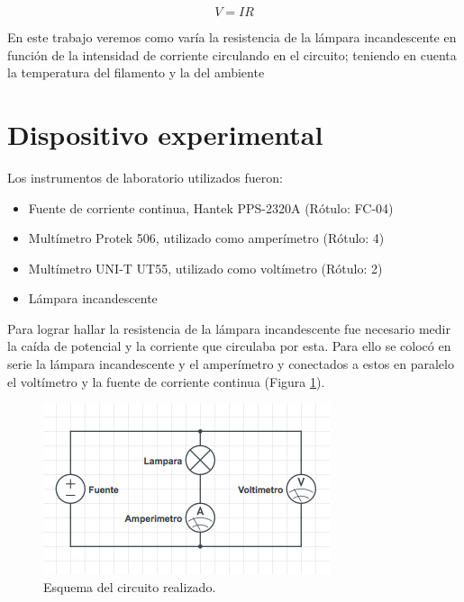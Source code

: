 \documentclass[twoside,twocolumn,a4paper]{article}
\begin{document}
\begin{equation}
\label{eq:ohm2}
V = IR
\end{equation}
\par En este trabajo veremos como var\'ia la resistencia de la l\'ampara incandescente en funci\'on de la intensidad de corriente circulando en el circuito; teniendo en cuenta la temperatura del filamento y la del ambiente



\section{Dispositivo experimental}

Los instrumentos de laboratorio utilizados fueron:
\begin{itemize}
\item 
\label{Fuente} Fuente de corriente continua, Hantek PPS-2320A (R\'otulo: FC-04)
\cite{Fuente}
\item 
\label{amp} Mult\'imetro Protek 506, utilizado como amper\'imetro (R\'otulo: 4)
\cite{amp}
\item 
\label{volt} Mult\'imetro UNI-T UT55, utilizado como volt\'imetro (R\'otulo: 2)
\cite{volt}
\item L\'ampara incandescente
\end{itemize}

Para lograr hallar la resistencia de la l\'ampara incandescente fue necesario medir la ca\'ida de potencial y la corriente que circulaba por esta. Para ello se coloc\'o en serie la l\'ampara incandescente y el amper\'imetro y conectados a estos en paralelo el volt\'imetro y la fuente de corriente continua (Figura \ref{fig:dsp_exp}).\par

\begin{figure}[h]
\includegraphics[width=\linewidth]{dispositivo_experimental.jpg}
\caption{Esquema del circuito realizado.}
\label{fig:dsp_exp}
\end{figure}
\end{document}
